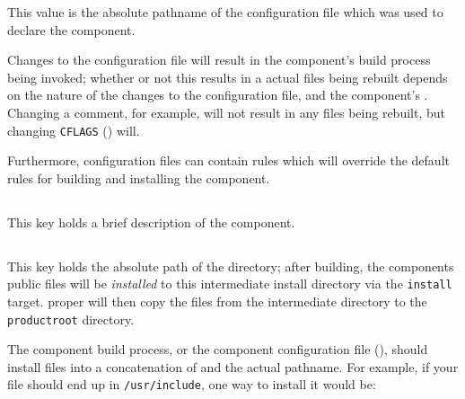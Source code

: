 This value is the absolute pathname of the configuration file which
was used to declare the component.

Changes to the configuration file will result in the component's build
process being invoked; whether or not this results in a actual files
being rebuilt depends on the nature of the changes to the
configuration file, and the component's \makefile.  Changing a
comment, for example, will not result in any files being rebuilt, but
changing \texttt{CFLAGS} () will.

Furthermore, configuration files can contain \makefile rules which
will override the default rules for building and installing the
component.

%


\subsection{}\label{variables:description}

This key holds a brief description of the component.


\subsection{}\label{variables:destdir-directory}

This key holds the absolute path of the \destdir directory; after
building, the components public files will be \emph{installed} to this
intermediate install directory via the \texttt{install} target.
\lmsbw proper will then copy the files from the intermediate directory
to the \texttt{productroot} directory.

The component build process, or the component configuration file
(), should install files into a concatenation of
\destdir and the actual pathname.  For example, if your file should
end up in \texttt{/usr/include}, one way to install it would be:


